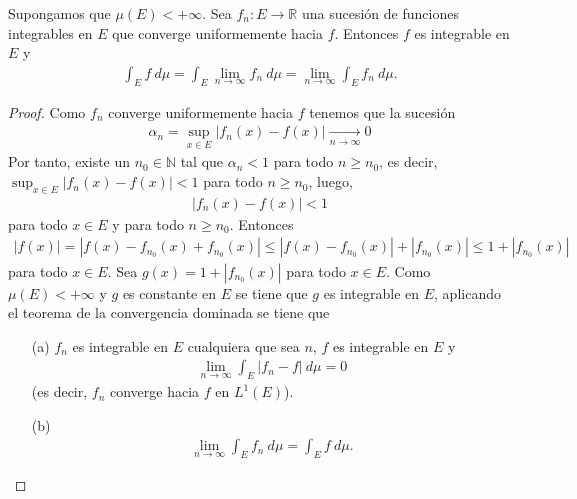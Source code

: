 \begin{cor}
    Supongamos que $\mu(E) < +\infty$. Sea $f_n: E \longrightarrow \mathbb{R}$ una sucesión de funciones integrables en $E$ que converge uniformemente hacia $f$. Entonces $f$ es integrable en $E$ y
    \begin{align*}
        \int_{E}{f \ d\mu} = \int_{E}{\lim_{n \to \infty}{f_n \ d\mu}} = \lim_{n \to \infty}{\int_{E}{f_n \ d\mu}}.
    \end{align*}
\end{cor}

\begin{proof}
    Como $f_n$ converge uniformemente hacia $f$ tenemos que la sucesión
    \begin{align*}
        \alpha_n = \sup_{x \in E}{|f_n(x) - f(x)|} \xrightarrow[n \to \infty]{} 0
    \end{align*}
    Por tanto, existe un $n_0 \in \mathbb{N}$ tal que $\alpha_n < 1$ para todo $n \ge n_0$, es decir, $\sup_{x \in E}{|f_n(x) - f(x)|} < 1$ para todo $n \ge n_0$, luego,
    \begin{align*}
        |f_n(x) - f(x)| < 1
    \end{align*}
    para todo $x \in E$ y para todo $n \ge n_0$. Entonces
    \begin{align*}
        |f(x)| = |f(x) - f_{n_0}(x) + f_{n_0}(x)| \leq |f(x) - f_{n_0}(x)| + |f_{n_0}(x)| \leq 1 + |f_{n_0}(x)|
    \end{align*}
    para todo $x \in E$. Sea $g(x) = 1 + |f_{n_0}(x)|$ para todo $x \in E$. Como $\mu(E) < +\infty$ y $g$ es constante en $E$ se tiene que $g$ es integrable en $E$, aplicando el teorema de la convergencia dominada se tiene que
    \begin{enumerate}
        \item[(a)] $f_n$ es integrable en $E$ cualquiera que sea $n$, $f$ es integrable en $E$ y
              \begin{align*}
                  \lim_{n \to \infty}{\int_{E}{|f_n - f| \ d\mu}} = 0
              \end{align*}
              (es decir, $f_n$ converge hacia $f$ en $L^1(E)$).
        \item[(b)]
              \begin{align*}
                  \lim_{n \to \infty}{\int_{E}{f_n \ d\mu}} = \int_{E}{f \ d\mu}.
              \end{align*}
    \end{enumerate}
\end{proof}

